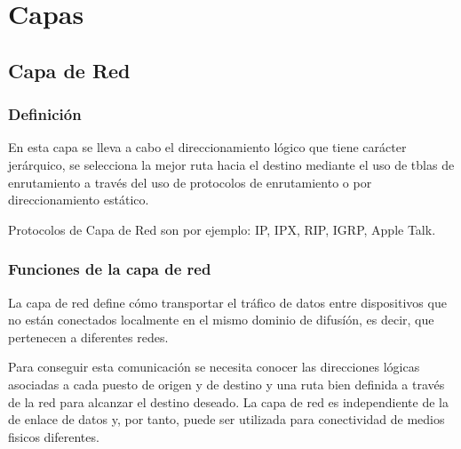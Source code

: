 \documentclass[12pt, fleqn]{report}                             %
\theoremstyle{break}                                            %
\begin{document}
\part{Capas}
\clearpage

    \chapter{Capa de Red}

        \clearpage
        \section{Definición}

            En esta capa se lleva a cabo el direccionamiento lógico que tiene carácter jerárquico, 
            se selecciona la mejor ruta hacia el destino mediante el uso de tblas de enrutamiento
            a través del uso de protocolos de enrutamiento o por direccionamiento estático.

            Protocolos de Capa de Red son por ejemplo: IP, IPX, RIP, IGRP, Apple Talk.

        \vspace{1em}
        \section{Funciones de la capa de red}

            La capa de red define cómo transportar el tráfico de datos entre dispositivos que no 
            están conectados localmente en el mismo dominio de difusíón, es decir, que pertenecen
            a diferentes redes.

            Para conseguir esta comunicación se necesita conocer las direcciones
            lógicas asociadas a cada puesto de origen y de destino y una ruta bien definida a través
            de la red para alcanzar el destino deseado.  La capa de red es independiente de la de
            enlace de datos y, por tanto, puede ser utilizada para conectividad de medios fisicos 
            diferentes.
\end{document}

